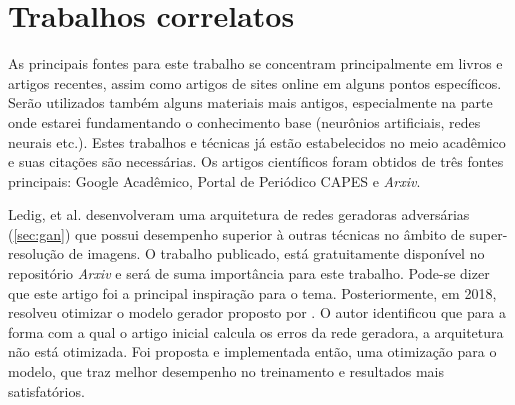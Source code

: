 \section{Trabalhos correlatos}

As principais fontes para este trabalho se concentram principalmente em livros e artigos recentes, assim como artigos de sites online em alguns pontos específicos. Serão utilizados também alguns materiais mais antigos, especialmente na parte onde estarei fundamentando o conhecimento base (neurônios artificiais, redes neurais etc.). Estes trabalhos e técnicas já estão estabelecidos no meio acadêmico e suas citações são necessárias. Os artigos científicos foram obtidos de três fontes principais: Google Acadêmico, Portal de Periódico CAPES e \textit{Arxiv}.

Ledig, et al. \cite{ledig_photo-realistic_2017} desenvolveram uma arquitetura de redes geradoras adversárias (\ref{sec:gan}) que possui desempenho superior à outras técnicas no âmbito de super-resolução de imagens. O trabalho publicado, está gratuitamente disponível no repositório \textit{Arxiv} e será de suma importância para este trabalho. Pode-se dizer que este artigo foi a principal inspiração para o tema. Posteriormente, em 2018, \cite{wang_esrgan_2018} resolveu otimizar o modelo gerador proposto por \cite{ledig_photo-realistic_2016}. O autor identificou que para a forma com a qual o artigo inicial calcula os erros da rede geradora, a arquitetura não está otimizada. Foi proposta e implementada então, uma otimização para o modelo, que traz melhor desempenho no treinamento e resultados mais satisfatórios.

